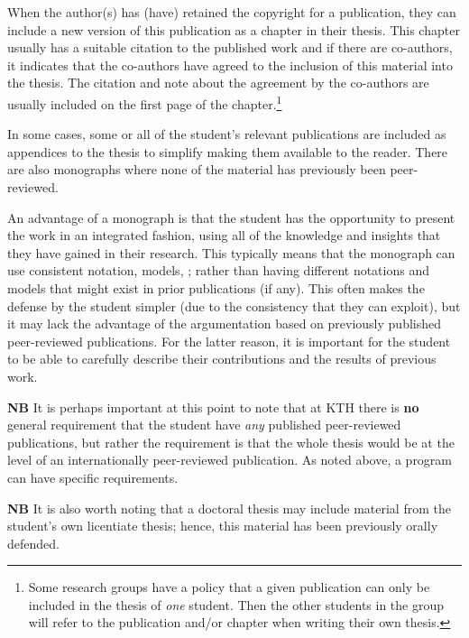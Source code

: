\documentclass[12pt, twoside]{article}
\begin{document}
When the author(s) has (have) retained the copyright for a publication, they can include a new version of this publication as a chapter in their thesis. This chapter usually has a suitable citation to the published work and if there are co-authors, it indicates that the co-authors have agreed to the inclusion of this material into the thesis. The citation and note about the agreement by the co-authors are usually included on the first page of the chapter.\footnote{Some research groups have a policy that a given publication can only be included in the thesis of \emph{one} student. Then the other students in the group will refer to the publication and/or chapter when writing their own thesis.}

In some cases, some or all of the student's relevant publications are included as appendices to the thesis to simplify making them available to the reader.
There are also monographs where none of the material has previously been peer-reviewed.

An advantage of a monograph is that the student has the opportunity to present the work in an integrated fashion, using all of the knowledge and insights that they have gained in their research. This typically means that the monograph can use consistent notation, models, \etc; rather than having different notations and models that might exist in prior publications (if any). This often makes the defense by the student simpler (due to the consistency that they can exploit), but it may lack the advantage of the argumentation based on previously published peer-reviewed publications. For the latter reason, it is important for the student to be able to carefully describe their contributions and the results of previous work.
\medskip

\noindent\textbf{NB} It is perhaps important at this point to note that at \gls{KTH} there is \textbf{no} general requirement that the student have \textit{any} published peer-reviewed publications, but rather the requirement is that the whole thesis would be at the level of an internationally peer-reviewed publication. As noted above, a program can have specific requirements.
\medskip

\noindent\textbf{NB} It is also worth noting that a doctoral thesis may include material from the student's own licentiate thesis; hence, this material has been previously orally defended.
\end{document}
